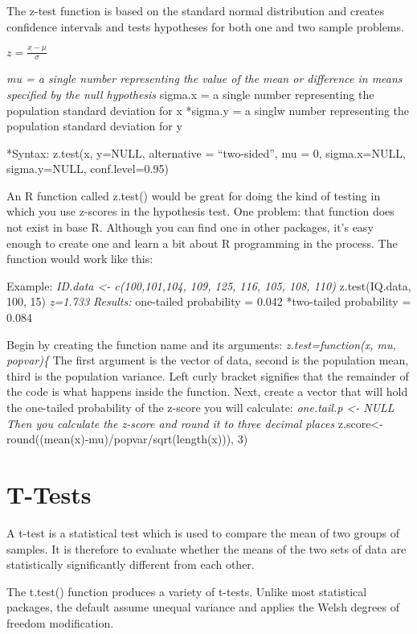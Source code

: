\documentclass[]{article}
\begin{document}
The z-test function is based on the standard normal distribution and
creates confidence intervals and tests hypotheses for both one and two
sample problems.

\(z = \frac{x-μ}{σ}\)

\emph{mu = a single number representing the value of the mean or
difference in means specified by the null hypothesis }sigma.x = a single
number representing the population standard deviation for x *sigma.y = a
singlw number representing the population standard deviation for y

*Syntax: z.test(x, y=NULL, alternative = ``two-sided'', mu = 0,
sigma.x=NULL, sigma.y=NULL, conf.level=0.95)

An R function called z.test() would be great for doing the kind of
testing in which you use z-scores in the hypothesis test. One problem:
that function does not exist in base R. Although you can find one in
other packages, it's easy enough to create one and learn a bit about R
programming in the process. The function would work like this:

Example: \emph{ID.data \textless{}- c(100,101,104, 109, 125, 116, 105,
108, 110) }z.test(IQ.data, 100, 15) \emph{z=1.733 Results: }one-tailed
probability = 0.042 *two-tailed probability = 0.084

Begin by creating the function name and its arguments:
\emph{z.test=function(x, mu, popvar)\{ }The first argument is the vector
of data, second is the population mean, third is the population
variance. Left curly bracket signifies that the remainder of the code is
what happens inside the function. Next, create a vector that will hold
the one-tailed probability of the z-score you will calculate:
\emph{one.tail.p \textless{}- NULL Then you calculate the z-score and
round it to three decimal places }z.score\textless{}-
round((mean(x)-mu)/popvar/sqrt(length(x))), 3)

\hypertarget{t-tests}{%
\section{T-Tests}\label{t-tests}}

A t-test is a statistical test which is used to compare the mean of two
groups of samples. It is therefore to evaluate whether the means of the
two sets of data are statistically significantly different from each
other.

The t.test() function produces a variety of t-tests. Unlike most
statistical packages, the default assume unequal variance and applies
the Welsh degrees of freedom modification.
\end{document}
